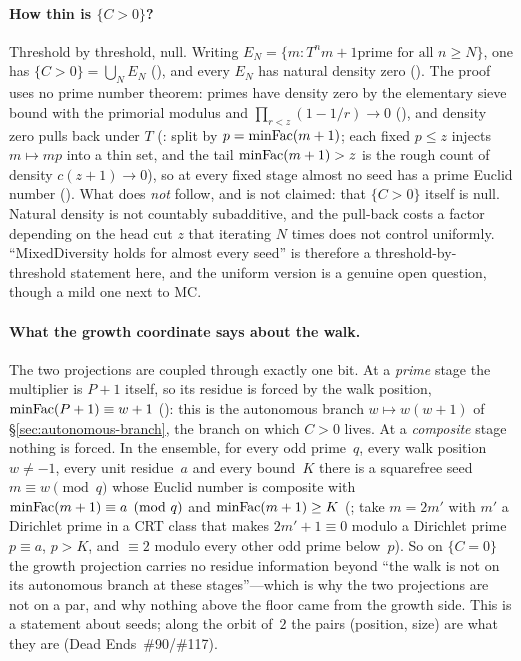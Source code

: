 \paragraph{How thin is $\{C>0\}$?}
\label{sec:growth-density}
Threshold by threshold, null.  Writing $E_N = \{m : T^n m + 1 \text{
prime for all } n \ge N\}$, one has $\{C > 0\} = \bigcup_N E_N$
(),
and every $E_N$ has natural density zero
().
The proof uses no prime number theorem: primes have density zero by the
elementary sieve bound with the primorial modulus and $\prod_{r<z}(1-1/r)
\to 0$ (),
and density zero pulls back under $T$
(: split by
$p = \mathrm{minFac}(m+1)$; each fixed $p \le z$ injects $m \mapsto mp$ into a thin
set, and the tail $\mathrm{minFac}(m+1) > z$ is the rough count of density
$c(z{+}1) \to 0$), so at every fixed stage almost no seed has a prime
Euclid number
().
What does \emph{not} follow, and is not claimed: that $\{C>0\}$ itself is
null.  Natural density is not countably subadditive, and the pull-back
costs a factor depending on the head cut $z$ that iterating $N$ times does
not control uniformly.  ``MixedDiversity holds for almost every seed'' is
therefore a threshold-by-threshold statement here, and the uniform version
is a genuine open question, though a mild one next to MC.

\paragraph{What the growth coordinate says about the walk.}
\label{sec:size-residue}
The two projections are coupled through exactly one bit.  At a
\emph{prime} stage the multiplier is $P+1$ itself, so its residue is forced
by the walk position, $\mathrm{minFac}(P+1) \equiv w+1$
():
this is the autonomous branch $w \mapsto w(w+1)$ of
\S\ref{sec:autonomous-branch}, the branch on which $C>0$ lives.  At a
\emph{composite} stage nothing is forced.  In the ensemble, for every odd
prime~$q$, every walk position $w \ne -1$, every unit residue~$a$ and every
bound~$K$ there is a squarefree seed $m \equiv w \pmod q$ whose Euclid
number is composite with $\mathrm{minFac}(m+1) \equiv a \pmod q$ and
$\mathrm{minFac}(m+1) \ge K$
(;
take $m = 2m'$ with $m'$ a Dirichlet prime in a CRT class that makes
$2m'+1 \equiv 0$ modulo a Dirichlet prime $p \equiv a$, $p > K$, and
$\equiv 2$ modulo every other odd prime below~$p$).  So on $\{C = 0\}$ the
growth projection carries no residue information beyond ``the walk is not on
its autonomous branch at these stages''---which is why the two projections
are not on a par, and why nothing above the floor came from the growth
side.  This is a statement about seeds; along the orbit of~$2$ the pairs
(position, size) are what they are (Dead Ends~\#90/\#117).

